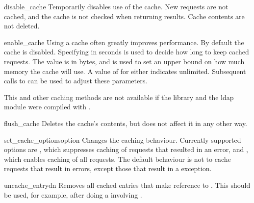 \begin{methoddesc}{disable_cache}{}
Temporarily disables use of the cache. New requests are not cached, and
the cache is not checked when returning results. Cache contents are not
deleted.
\end{methoddesc}


\begin{methoddesc}{enable_cache}{}
Using a cache often greatly improves performance. By default the cache
is disabled. Specifying  in seconds is used to decide how long
to keep cached requests. The  value is in bytes, and is used
to set an upper bound on how much memory the cache will use. A value of
 for either indicates unlimited. 
Subsequent calls to
 can be used to adjust these parameters.

This and other caching methods are not available if the library and the 
ldap module were compiled with .
\end{methoddesc}


\begin{methoddesc}{flush_cache}{}
Deletes the cache's contents, but does not affect it in any other way.
\end{methoddesc}


\begin{methoddesc}{set_cache_options}{option}
Changes the caching behaviour. Currently supported options are
    , which suppresses caching of requests
    	that resulted in an error, and
    , which enables caching of all requests.
The default behaviour is not to cache requests that result in errors, except 
those that result in a  exception.
\end{methoddesc}


\begin{methoddesc}{uncache_entry}{dn}
Removes all cached entries that make reference to . This should be
used, for example, after doing a  involving .
\end{methoddesc}

